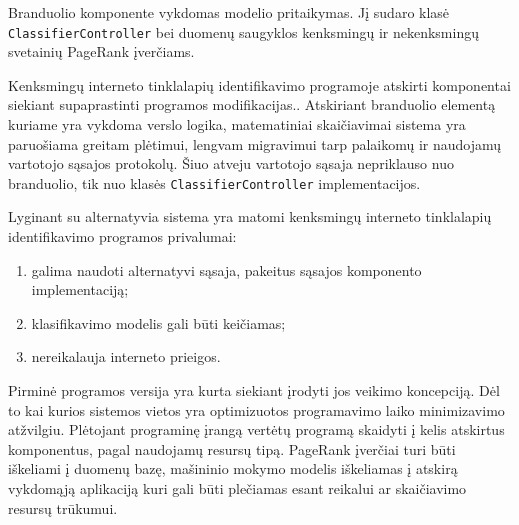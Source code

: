 Branduolio komponente vykdomas modelio pritaikymas. Jį sudaro klasė \texttt{ClassifierController} bei duomenų
saugyklos kenksmingų ir nekenksmingų svetainių PageRank įverčiams.

Kenksmingų interneto tinklalapių identifikavimo programoje atskirti komponentai siekiant supaprastinti programos modifikacijas.. Atskiriant branduolio elementą kuriame yra
vykdoma verslo logika, matematiniai skaičiavimai sistema yra paruošiama greitam plėtimui, lengvam migravimui
tarp palaikomų ir naudojamų vartotojo sąsajos protokolų. Šiuo atveju vartotojo sąsaja nepriklauso nuo
branduolio, tik nuo klasės \texttt{ClassifierController} implementacijos.

Lyginant su alternatyvia sistema \cite{gapi} yra matomi kenksmingų interneto tinklalapių identifikavimo programos privalumai:
 \begin{enumerate}
    \item galima naudoti alternatyvi sąsaja, pakeitus sąsajos komponento implementaciją;
    \item klasifikavimo modelis gali būti keičiamas;
    \item nereikalauja interneto prieigos.
 \end{enumerate}

Pirminė programos versija yra kurta siekiant įrodyti jos veikimo koncepciją. Dėl to kai kurios sistemos vietos
yra optimizuotos programavimo laiko minimizavimo atžvilgiu. Plėtojant programinę įrangą vertėtų programą
skaidyti į kelis atskirtus komponentus, pagal naudojamų resursų tipą. PageRank įverčiai turi būti iškeliami
į duomenų bazę, mašininio mokymo modelis iškeliamas į atskirą vykdomąją aplikaciją kuri gali būti plečiamas
esant reikalui ar skaičiavimo resursų trūkumui.